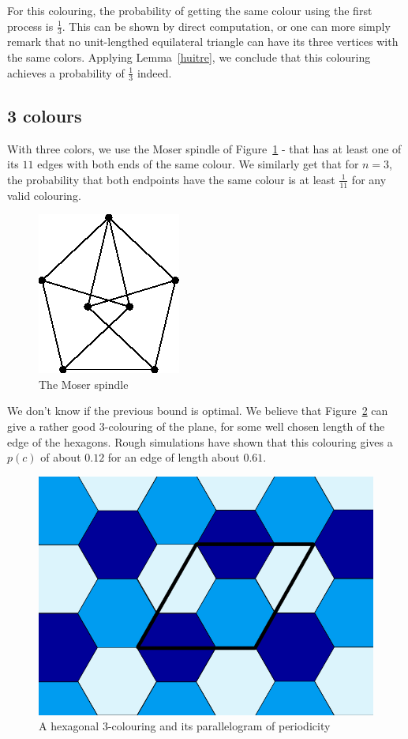 \documentclass[a4paper,11pt]{article}
\theoremstyle{definition}
\theoremstyle{remark}
\begin{document}
For this colouring, the probability of getting the same colour using the first 
process is $\frac13$. This can be shown by direct computation, or one can 
more simply remark that no unit-lengthed equilateral triangle can have its 
three vertices with the same colors. Applying Lemma~\ref{huitre}, we conclude 
that this colouring achieves a probability of $\frac{1}{3}$ indeed.

\subsection{3 colours}
 With three colors, we use the Moser spindle of Figure~\ref{color} - that 
 has at least one of its $11$ edges with both ends of the same colour.
 We similarly get that for $n=3$, the probability that both endpoints have the 
 same colour is at least 
 $\frac{1}{11}$ for any valid colouring. 

\begin{figure}[h]
\center
\includegraphics[scale=0.4]{T.png}
\caption{\label{color} The Moser spindle}
\end{figure}

We don't know if the previous bound is optimal. We believe that Figure~\ref{trois} 
can give a rather good $3$-colouring of the plane, for some well chosen length 
of the edge of the hexagons. Rough simulations have shown that this colouring gives a 
$p(c)$ of about $0.12$ for an edge of length about $0.61$. 

\begin{figure}[h]
\center
\includegraphics[scale=0.5]{trois.png}
\caption{\label{trois} A hexagonal $3$-colouring and its parallelogram of periodicity}
\end{figure}
\end{document}

